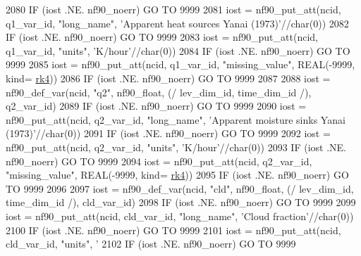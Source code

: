 \begin{DoxyCode}
2080     \textcolor{keywordflow}{IF} (iost .NE. nf90\_noerr) \textcolor{keywordflow}{GO TO} 9999
2081     iost    = nf90\_put\_att(ncid, q1\_var\_id, \textcolor{stringliteral}{"long\_name"}, \textcolor{stringliteral}{'Apparent heat sources Yanai (1973)'}//char(0))
2082     \textcolor{keywordflow}{IF} (iost .NE. nf90\_noerr) \textcolor{keywordflow}{GO TO} 9999
2083     iost    = nf90\_put\_att(ncid, q1\_var\_id, \textcolor{stringliteral}{"units"}, \textcolor{stringliteral}{'K/hour'}//char(0))
2084     \textcolor{keywordflow}{IF} (iost .NE. nf90\_noerr) \textcolor{keywordflow}{GO TO} 9999
2085     iost    = nf90\_put\_att(ncid, q1\_var\_id, \textcolor{stringliteral}{"missing\_value"}, \textcolor{keywordtype}{REAL}(-9999, kind=
      \hyperlink{namespaceportable_abaed22a509442771d3fba69bebda0b33}{rk4}))
2086     \textcolor{keywordflow}{IF} (iost .NE. nf90\_noerr) \textcolor{keywordflow}{GO TO} 9999
2087 
2088     iost    = nf90\_def\_var(ncid, \textcolor{stringliteral}{"q2"}, nf90\_float, (/ lev\_dim\_id, time\_dim\_id /), q2\_var\_id)
2089     \textcolor{keywordflow}{IF} (iost .NE. nf90\_noerr) \textcolor{keywordflow}{GO TO} 9999
2090     iost    = nf90\_put\_att(ncid, q2\_var\_id, \textcolor{stringliteral}{"long\_name"}, \textcolor{stringliteral}{'Apparent moisture sinks Yanai (1973)'}//char(0))
2091     \textcolor{keywordflow}{IF} (iost .NE. nf90\_noerr) \textcolor{keywordflow}{GO TO} 9999
2092     iost    = nf90\_put\_att(ncid, q2\_var\_id, \textcolor{stringliteral}{"units"}, \textcolor{stringliteral}{'K/hour'}//char(0))
2093     \textcolor{keywordflow}{IF} (iost .NE. nf90\_noerr) \textcolor{keywordflow}{GO TO} 9999
2094     iost    = nf90\_put\_att(ncid, q2\_var\_id, \textcolor{stringliteral}{"missing\_value"}, \textcolor{keywordtype}{REAL}(-9999, kind=
      \hyperlink{namespaceportable_abaed22a509442771d3fba69bebda0b33}{rk4}))
2095     \textcolor{keywordflow}{IF} (iost .NE. nf90\_noerr) \textcolor{keywordflow}{GO TO} 9999
2096 
2097     iost    = nf90\_def\_var(ncid, \textcolor{stringliteral}{"cld"}, nf90\_float, (/ lev\_dim\_id, time\_dim\_id /), cld\_var\_id)
2098     \textcolor{keywordflow}{IF} (iost .NE. nf90\_noerr) \textcolor{keywordflow}{GO TO} 9999
2099     iost    = nf90\_put\_att(ncid, cld\_var\_id, \textcolor{stringliteral}{"long\_name"}, \textcolor{stringliteral}{'Cloud fraction'}//char(0))
2100     \textcolor{keywordflow}{IF} (iost .NE. nf90\_noerr) \textcolor{keywordflow}{GO TO} 9999
2101     iost    = nf90\_put\_att(ncid, cld\_var\_id, \textcolor{stringliteral}{"units"}, \textcolor{stringliteral}{'%
2102     \textcolor{keywordflow}{IF} (iost .NE. nf90\_noerr) \textcolor{keywordflow}{GO TO} 9999
}
\end{DoxyCode}
